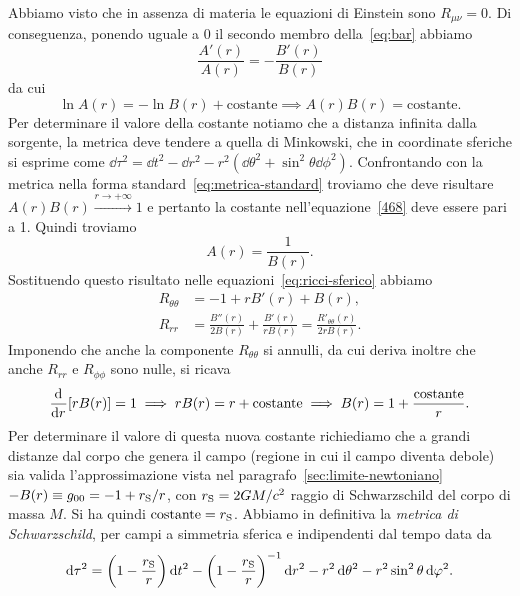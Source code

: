 Abbiamo visto che in assenza di materia le equazioni di Einstein sono 
$R_{\mu\nu} = 0$.  Di conseguenza, ponendo uguale a $0$ il secondo membro
della~\eqref{eq:bar} abbiamo
\begin{equation}
  \frac{A'(r)}{A(r)} = -\frac{B'(r)}{B(r)}
\end{equation}
da cui
\begin{equation}
  \ln A(r) = - \ln B(r) + \text{costante} \implies A(r)B(r) = \text{costante}.
\label{468}
\end{equation}
Per determinare il valore della costante notiamo che a distanza infinita dalla
sorgente, la metrica deve tendere a quella di Minkowski, che in coordinate
sferiche si esprime come $\dd\tau^{2} = \dd t^{2} -\dd r^{2} -
r^{2}(\dd\theta^{2} + \sin^{2}\theta \dd\phi^{2})$. Confrontando con la metrica
nella forma standard~\eqref{eq:metrica-standard} troviamo che deve risultare
$A(r) B(r) \xrightarrow{r \to +\infty} 1$ e pertanto la costante
nell'equazione~\eqref{468} deve essere pari a 1.  Quindi troviamo
\begin{equation}
  A(r) = \frac{1}{B(r)}.
\end{equation}
Sostituendo questo risultato nelle equazioni~\eqref{eq:ricci-sferico} abbiamo
\begin{subequations}
  \begin{align}
    R_{\theta\theta} &= -1 + rB'(r) + B(r), \\
    R_{rr} &= \frac{B''(r)}{2B(r)} + \frac{B'(r)}{rB(r)} =
    \frac{R'_{\theta\theta}(r)}{2rB(r)}.
  \end{align}
\end{subequations}
Imponendo che anche la componente $R_{\theta\theta}$ si annulli, da cui deriva
inoltre che anche $R_{rr}$ e $R_{\phi\phi}$ sono nulle, si ricava
\begin{equation}
  \frac{{\mathop{}\!\mathrm{d}^{}}}{\mathop{}\!\mathrm{d} {r}^{}}[rB(r)] = 1 \implies rB(r) = r + \text{costante} \implies B(r) = 1
  + \frac{\text{costante}}{r}.
\end{equation}
Per determinare il valore di questa nuova costante richiediamo che a grandi
distanze dal corpo che genera il campo (regione in cui il campo diventa debole)
sia valida l'approssimazione vista nel paragrafo~\ref{sec:limite-newtoniano}
$-B(r) \equiv g_{00} =  -1 + r_{\textup{S}}/r$, con $r_{\textup{S}}=2GM/c^2$ 
raggio di Schwarzschild del corpo di massa $M$.  Si ha quindi 
$\text{costante} = r_{\textup{S}}$. Abbiamo in definitiva la
\emph{metrica di Schwarzschild}, per campi a
simmetria sferica e indipendenti dal tempo data da
\begin{equation}
  \label{eq:metrica-schwarzschild}
  \mathop{}\!\mathrm{d}\tau^{2} = \bigg(1 - \frac{r_{\textup{S}}}{r} \bigg) \mathop{}\!\mathrm{d} t^{2} - \bigg(1 -
  \frac{r_{\textup{S}}}{r}\bigg)^{-1}\mathop{}\!\mathrm{d} r^{2} - r^{2}\mathop{}\!\mathrm{d}\theta^{2} -
  r^{2}\sin^{2}\theta \mathop{}\!\mathrm{d}\varphi^{2}.
\end{equation}

